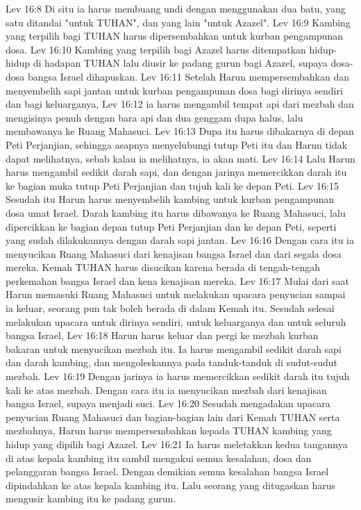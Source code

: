Lev 16:8  Di situ ia harus membuang undi dengan menggunakan dua batu, yang satu ditandai "untuk TUHAN", dan yang lain "untuk Azazel".
Lev 16:9  Kambing yang terpilih bagi TUHAN harus dipersembahkan untuk kurban pengampunan dosa.
Lev 16:10  Kambing yang terpilih bagi Azazel harus ditempatkan hidup-hidup di hadapan TUHAN lalu diusir ke padang gurun bagi Azazel, supaya dosa-dosa bangsa Israel dihapuskan.
Lev 16:11  Setelah Harun mempersembahkan dan menyembelih sapi jantan untuk kurban pengampunan dosa bagi dirinya sendiri dan bagi keluarganya,
Lev 16:12  ia harus mengambil tempat api dari mezbah dan mengisinya penuh dengan bara api dan dua genggam dupa halus, lalu membawanya ke Ruang Mahasuci.
Lev 16:13  Dupa itu harus dibakarnya di depan Peti Perjanjian, sehingga asapnya menyelubungi tutup Peti itu dan Harun tidak dapat melihatnya, sebab kalau ia melihatnya, ia akan mati.
Lev 16:14  Lalu Harun harus mengambil sedikit darah sapi, dan dengan jarinya memercikkan darah itu ke bagian muka tutup Peti Perjanjian dan tujuh kali ke depan Peti.
Lev 16:15  Sesudah itu Harun harus menyembelih kambing untuk kurban pengampunan dosa umat Israel. Darah kambing itu harus dibawanya ke Ruang Mahasuci, lalu dipercikkan ke bagian depan tutup Peti Perjanjian dan ke depan Peti, seperti yang sudah dilakukannya dengan darah sapi jantan.
Lev 16:16  Dengan cara itu ia menyucikan Ruang Mahasuci dari kenajisan bangsa Israel dan dari segala dosa mereka. Kemah TUHAN harus disucikan karena berada di tengah-tengah perkemahan bangsa Israel dan kena kenajisan mereka.
Lev 16:17  Mulai dari saat Harun memasuki Ruang Mahasuci untuk melakukan upacara penyucian sampai ia keluar, seorang pun tak boleh berada di dalam Kemah itu. Sesudah selesai melakukan upacara untuk dirinya sendiri, untuk keluarganya dan untuk seluruh bangsa Israel,
Lev 16:18  Harun harus keluar dan pergi ke mezbah kurban bakaran untuk menyucikan mezbah itu. Ia harus mengambil sedikit darah sapi dan darah kambing, dan mengoleskannya pada tanduk-tanduk di sudut-sudut mezbah.
Lev 16:19  Dengan jarinya ia harus memercikkan sedikit darah itu tujuh kali ke atas mezbah. Dengan cara itu ia menyucikan mezbah dari kenajisan bangsa Israel, supaya menjadi suci.
Lev 16:20  Sesudah mengadakan upacara penyucian Ruang Mahasuci dan bagian-bagian lain dari Kemah TUHAN serta mezbahnya, Harun harus mempersembahkan kepada TUHAN kambing yang hidup yang dipilih bagi Azazel.
Lev 16:21  Ia harus meletakkan kedua tangannya di atas kepala kambing itu sambil mengakui semua kesalahan, dosa dan pelanggaran bangsa Israel. Dengan demikian semua kesalahan bangsa Israel dipindahkan ke atas kepala kambing itu. Lalu seorang yang ditugaskan harus mengusir kambing itu ke padang gurun.
